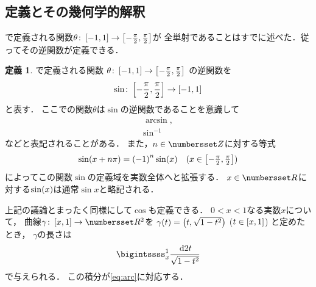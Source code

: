 \documentclass[11pt,a4paper]{ltjsarticle}
\newcommand*{\coord}[1]{\paren{#1}}
\newcommand*{\intd}{\dl2}
\newcommand*{\inv}[1]{{#1}^{-1}}
\theoremstyle{definition}
\newtheorem{dfn}{定義}[section]
\begin{document}
\subsection{定義とその幾何学的解釈} \label{subsec:dfngeo}

で定義される関数$\theta \colon \interval{c}{-1,1} \to \interval{c}{- \frac{\pi}{2}, \frac{\pi}{2}}$が
全単射であることはすでに述べた．従ってその逆関数が定義できる．

\begin{dfn} \label{dfn:sin}
  で定義される関数
  $\theta \colon \interval{c}{-1,1} \to \interval{c}{- \frac{\pi}{2}, \frac{\pi}{2}}$
  の逆関数を
  \begin{align}
    \sin \colon \interval{c}{- \frac{\pi}{2}, \frac{\pi}{2}} \to \interval{c}{-1,1}
    \label{eq:sin}
  \end{align}
  と表す．
  ここでの関数$\theta$は$\sin$の逆関数であることを意識して
  \begin{align}
    \arcsin,
    \label{eq:arcsin} \\
    \inv{\sin}
    \label{eq:invsin}
  \end{align}
  などと表記されることがある．
  また，$n \in \Zahlen$に対する等式
  \begin{align}
    \apply{\sin}{x + n \pi} = \paren{-1}^n \apply{\sin}{x} \quad \text{($\textstyle x \in \interval{c}{-\frac{\pi}{2}, \frac{\pi}{2}}$)}
    \label{eq:sinperiod}
  \end{align}
  によってこの関数$\sin$の定義域を実数全体へと拡張する．
  $x \in \Real$に対する$\apply{\sin}{x}$は通常$\sin x$と略記される．
\end{dfn}

上記の議論とまったく同様にして$\cos$も定義できる．
$0 < x < 1$なる実数$x$について，
曲線$\gamma \colon \interval{c}{x,1} \to \Real^2$を
$\apply{\gamma}{t} = \coord{t, \sqrt{1 - t^2}}$ ($t \in \interval{c}{x,1}$)
と定めたとき，
$\gamma$の長さは
\begin{align}
  \bigintssss_x^1 \frac{\intd t}{\sqrt{1 - t^2}}
  \label{eq:arcx}
\end{align}
で与えられる．
この積分が\cref{eq:arc}に対応する．
\end{document}

